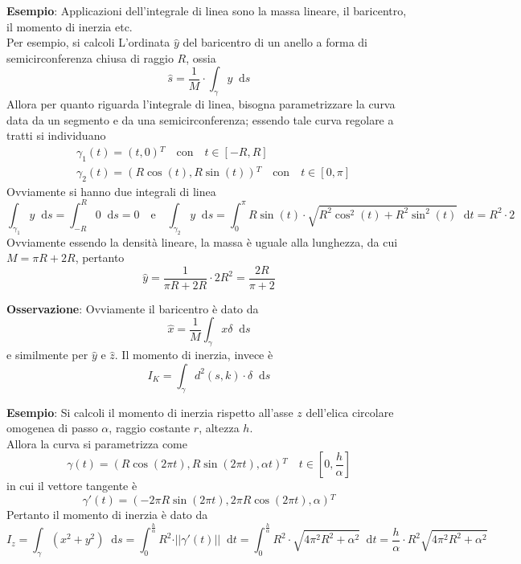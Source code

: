 \documentclass[a4paper]{extarticle}
\newcommand*\dif{\mathop{}\!\mathrm{d}}
\begin{document}
\vspace{2em}
\noindent
\textbf{Esempio}: Applicazioni dell'integrale di linea sono la massa lineare, il baricentro, il momento di inerzia etc.\\
Per esempio, si calcoli L'ordinata $\hat y$
del baricentro di un anello a forma di semicirconferenza chiusa di raggio $R$, ossia
\[\hat s = \dfrac{1}{M} \cdot \int_\gamma y \dif s\]
Allora per quanto riguarda l'integrale di linea, bisogna parametrizzare la curva data da un segmento e da una semicirconferenza; essendo tale curva regolare a tratti si individuano
\begin{align*}
    &\gamma_1(t)=(t,0){^T} \hspace{1em} \text{con} \hspace{1em} t \in [-R,R]\\
    &\gamma_2(t) = \left(R \cos(t), R\sin(t)\right){^T} \hspace{1em} \text{con} \hspace{1em} t \in [0,\pi]
\end{align*}
Ovviamente si hanno due integrali di linea
\[\int_{\gamma_1} y \dif s = \int_{-R}^{R} 0 \dif s = 0 \hspace{1em} \text{e} \hspace{1em} \int_{\gamma_2} y \dif s = \int_{0}^{\pi} R \sin(t) \cdot \sqrt{R^2 \cos^2(t) + R^2 \sin^2(t)} \dif t =R^2 \cdot 2\]
Ovviamente essendo la densità lineare, la massa è uguale alla lunghezza, da cui $M=\pi R+2R$, pertanto
\[\hat y = \frac{1}{\pi R + 2R} \cdot 2R^2 = \frac{2R}{\pi+2}\]

\vspace{2em}
\noindent
\textbf{Osservazione}: Ovviamente il baricentro è dato da
\[\hat x = \frac{1}{M} \int_\gamma x \delta \dif s\]
e similmente per $\hat y$ e $\hat z$. Il momento di inerzia, invece è
\[I_K = \int_\gamma d^2(s,k) \cdot \delta \dif s\]

\vspace{1em}
\noindent
\textbf{Esempio}: Si calcoli il momento di inerzia rispetto all'asse $z$ dell'elica circolare omogenea di passo $\alpha$, raggio costante $r$, altezza $h$.\\
Allora la curva si parametrizza come
\[\gamma(t)=\left(R \cos(2\pi t), R \sin(2 \pi t), \alpha t\right){^T} \hspace{1em} t \in \left[0, \frac{h}{\alpha}\right]\]
in cui il vettore tangente è
\[\gamma'(t) = (- 2\pi R \sin(2\pi t), 2\pi R \cos(2\pi t), \alpha){^T}\]
Pertanto il momento di inerzia è dato da
\[I_z = \int_\gamma (x^2+y^2) \dif s = \int_0^{\frac{h}{\alpha}} R^2 \cdot \vert\vert \gamma'(t) \vert\vert \dif t = \int_{0}^{\frac{h}{\alpha}} R^2 \cdot \sqrt{4\pi^2 R^2 + \alpha^2} \dif t = \frac{h}{\alpha} \cdot R^2 \sqrt{4\pi^2 R^2 + \alpha^2}\]
\end{document}

